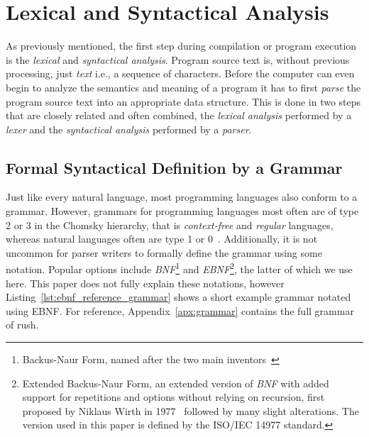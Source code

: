 \section{Lexical and Syntactical Analysis}

As previously mentioned, the first step during compilation or program execution is the \emph{lexical} and \emph{syntactical analysis}.
Program source text is, without previous processing, just \emph{text} i.e., a sequence of characters.
Before the computer can even begin to analyze the semantics and meaning of a program it has to first \emph{parse} the program source text into an appropriate data structure.
This is done in two steps that are closely related and often combined, the \emph{lexical analysis} performed by a \emph{lexer} and the \emph{syntactical analysis} performed by a \emph{parser}.

\subsection{Formal Syntactical Definition by a Grammar}

Just like every natural language, most programming languages also conform to a grammar.
However, grammars for programming languages most often are of type 2 or 3 in the Chomsky hierarchy, that is \emph{context-free} and \emph{regular} languages, whereas natural languages often are type 1 or 0~\cite[p.~24]{Watson2017}.
Additionally, it is not uncommon for parser writers to formally define the grammar using some notation.
Popular options include \emph{BNF}\footnote{Backus-Naur Form, named after the two main inventors~\cite{Backus1960}} and \emph{EBNF}\footnote{Extended Backus-Naur Form, an extended version of \emph{BNF} with added support for repetitions and options without relying on recursion, first proposed by Niklaus Wirth in 1977~\cite{Wirth1977} followed by many slight alterations. The version used in this paper is defined by the ISO/IEC 14977 standard.}, the latter of which we use here.
This paper does not fully explain these notations, however Listing~\ref{lst:ebnf_reference_grammar} shows a short example grammar notated using EBNF.
For reference, Appendix~\ref{apx:grammar} contains the full grammar of rush.


